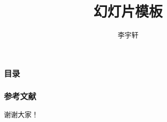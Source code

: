 \documentclass{beamer-bismuth}
\title{幻灯片模板}
\institute{上海科技大学\quad 信息学院}
\author{李宇轩}
\begin{document}
\begin{frame}
    \titlepage
\end{frame}

\begin{frame}
    \frametitle{目录}
    \tableofcontents[hideallsubsections]
\end{frame}

\nocite{*}



\begin{frame}[allowframebreaks]
    \frametitle{参考文献}
    
\end{frame}

\begin{frame}
    \begin{center}
        \LARGE 谢谢大家！
    \end{center}
\end{frame}
\end{document}

